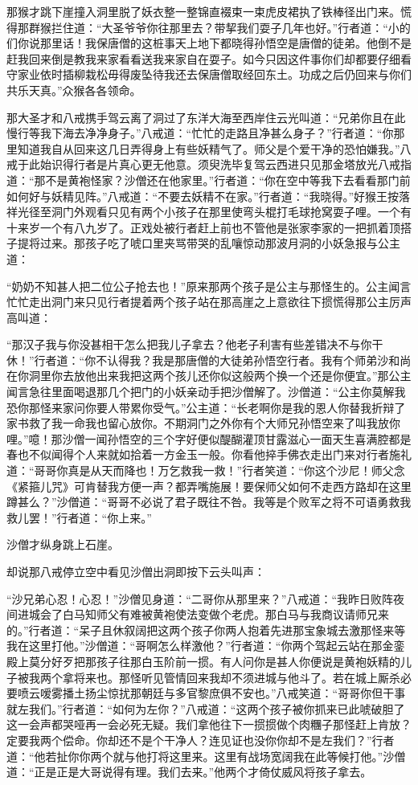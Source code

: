 \documentclass[12pt,UTF8]{ctexbook}
\begin{document}
{那猴才跳下崖撞入洞里脱了妖衣整一整锦直裰束一束虎皮裙执了铁棒径出门来。慌得那群猴拦住道：“大圣爷爷你往那里去？带挈我们耍子几年也好。”行者道：“小的们你说那里话！我保唐僧的这桩事天上地下都晓得孙悟空是唐僧的徒弟。他倒不是赶我回来倒是教我来家看看送我来家自在耍子。如今只因这件事你们却都要仔细看守家业依时插柳栽松毋得废坠待我还去保唐僧取经回东土。功成之后仍回来与你们共乐天真。”众猴各各领命。

那大圣才和八戒携手驾云离了洞过了东洋大海至西岸住云光叫道：“兄弟你且在此慢行等我下海去净净身子。”八戒道：“忙忙的走路且净甚么身子？”行者道：“你那里知道我自从回来这几日弄得身上有些妖精气了。师父是个爱干净的恐怕嫌我。”八戒于此始识得行者是片真心更无他意。须臾洗毕复驾云西进只见那金塔放光八戒指道：“那不是黄袍怪家？沙僧还在他家里。”行者道：“你在空中等我下去看看那门前如何好与妖精见阵。”八戒道：“不要去妖精不在家。”行者道：“我晓得。”好猴王按落祥光径至洞门外观看只见有两个小孩子在那里使弯头棍打毛球抢窝耍子哩。一个有十来岁一个有八九岁了。正戏处被行者赶上前也不管他是张家李家的一把抓着顶搭子提将过来。那孩子吃了唬口里夹骂带哭的乱嚷惊动那波月洞的小妖急报与公主道：

“奶奶不知甚人把二位公子抢去也！”原来那两个孩子是公主与那怪生的。公主闻言忙忙走出洞门来只见行者提着两个孩子站在那高崖之上意欲往下掼慌得那公主厉声高叫道：

“那汉子我与你没甚相干怎么把我儿子拿去？他老子利害有些差错决不与你干休！”行者道：“你不认得我？我是那唐僧的大徒弟孙悟空行者。我有个师弟沙和尚在你洞里你去放他出来我把这两个孩儿还你似这般两个换一个还是你便宜。”那公主闻言急往里面喝退那几个把门的小妖亲动手把沙僧解了。沙僧道：“公主你莫解我恐你那怪来家问你要人带累你受气。”公主道：“长老啊你是我的恩人你替我折辩了家书救了我一命我也留心放你。不期洞门之外你有个大师兄孙悟空来了叫我放你哩。”噫！那沙僧一闻孙悟空的三个字好便似醍醐灌顶甘露滋心一面天生喜满腔都是春也不似闻得个人来就如拾着一方金玉一般。你看他捽手佛衣走出门来对行者施礼道：“哥哥你真是从天而降也！万乞救我一救！”行者笑道：“你这个沙尼！师父念《紧箍儿咒》可肯替我方便一声？都弄嘴施展！要保师父如何不走西方路却在这里蹲甚么？”沙僧道：“哥哥不必说了君子既往不咎。我等是个败军之将不可语勇救我救儿罢！”行者道：“你上来。”

沙僧才纵身跳上石崖。

却说那八戒停立空中看见沙僧出洞即按下云头叫声：

“沙兄弟心忍！心忍！”沙僧见身道：“二哥你从那里来？”八戒道：“我昨日败阵夜间进城会了白马知师父有难被黄袍使法变做个老虎。那白马与我商议请师兄来的。”行者道：“呆子且休叙阔把这两个孩子你两人抱着先进那宝象城去激那怪来等我在这里打他。”沙僧道：“哥啊怎么样激他？”行者道：“你两个驾起云站在那金銮殿上莫分好歹把那孩子往那白玉阶前一掼。有人问你是甚人你便说是黄袍妖精的儿子被我两个拿将来也。那怪听见管情回来我却不须进城与他斗了。若在城上厮杀必要喷云嗳雾播土扬尘惊扰那朝廷与多官黎庶俱不安也。”八戒笑道：“哥哥你但干事就左我们。”行者道：“如何为左你？”八戒道：“这两个孩子被你抓来已此唬破胆了这一会声都哭哑再一会必死无疑。我们拿他往下一掼掼做个肉糰子那怪赶上肯放？定要我两个偿命。你却还不是个干净人？连见证也没你你却不是左我们？”行者道：“他若扯你你两个就与他打将这里来。这里有战场宽阔我在此等候打他。”沙僧道：“正是正是大哥说得有理。我们去来。”他两个才倚仗威风将孩子拿去。

}
\end{document}
